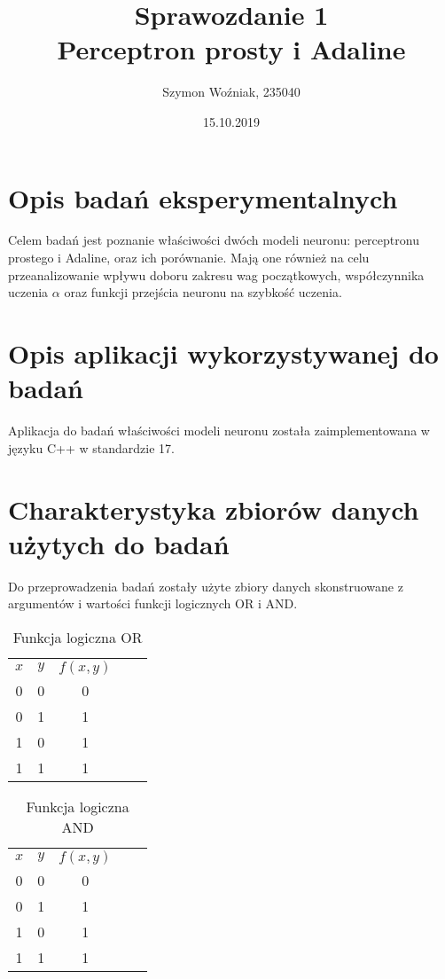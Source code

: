 \documentclass{article}
\author{Szymon Woźniak, 235040}
\date{15.10.2019}
\title{Sprawozdanie 1\\Perceptron prosty i Adaline}
\begin{document}
	\maketitle
	\newpage
	
	\section{Opis badań eksperymentalnych}
	Celem badań jest poznanie właściwości dwóch modeli neuronu: perceptronu prostego i Adaline,
	oraz ich porównanie. Mają one również na celu przeanalizowanie wpływu doboru zakresu wag początkowych, współczynnika uczenia $\alpha$ oraz funkcji przejścia neuronu na szybkość uczenia.
	\section{Opis aplikacji wykorzystywanej do badań}
	Aplikacja do badań właściwości modeli neuronu została zaimplementowana w języku C++ w standardzie 17.
	\section{Charakterystyka zbiorów danych użytych do badań}
		Do przeprowadzenia badań zostały użyte zbiory danych
		skonstruowane z argumentów i wartości funkcji logicznych OR i AND.
		\begin{table}[H]
			\centering
			\caption{Funkcja logiczna OR}
			\label{tab:or-func}
			\begin{tabular}{|c|c|c|ll}
			\cline{1-3}
			$x$ & $y$ & $f(x, y)$ &  &  \\ \cline{1-3}
			0 & 0 & 0       &  &  \\ \cline{1-3}
			0 & 1 & 1       &  &  \\ \cline{1-3}
			1 & 0 & 1       &  &  \\ \cline{1-3}
			1 & 1 & 1       &  &  \\ \cline{1-3}
			\end{tabular}
			\end{table}
		\begin{table}[H]
			\centering
			\caption{Funkcja logiczna AND}
			\label{tab:and-func}
			\begin{tabular}{|c|c|c|ll}
			\cline{1-3}
			$x$ & $y$ & $f(x, y)$ &  &  \\ \cline{1-3}
			0 & 0 & 0       &  &  \\ \cline{1-3}
			0 & 1 & 1       &  &  \\ \cline{1-3}
			1 & 0 & 1       &  &  \\ \cline{1-3}
			1 & 1 & 1       &  &  \\ \cline{1-3}
			\end{tabular}
			\end{table}
\end{document}
